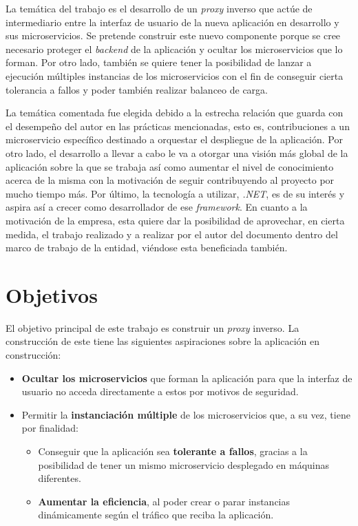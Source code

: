 \documentclass[11pt,spanish,listoffigures]{tfgetsinf}
\begin{document}
La temática del trabajo es el desarrollo de un \emph{proxy} inverso que actúe de intermediario entre la interfaz de usuario de la nueva aplicación en desarrollo y sus microservicios. Se pretende construir este nuevo componente porque se cree necesario proteger el \emph{backend} de la aplicación y ocultar los microservicios que lo forman. Por otro lado, también se quiere tener la posibilidad de lanzar a ejecución múltiples instancias de los microservicios con el fin de conseguir cierta tolerancia a fallos y poder también realizar balanceo de carga.

La temática comentada fue elegida debido a la estrecha relación que guarda con el desempeño del autor en las prácticas mencionadas, esto es, contribuciones a un microservicio específico destinado a orquestar el despliegue de la aplicación. Por otro lado, el desarrollo a llevar a cabo le va a otorgar una visión más global de la aplicación sobre la que se trabaja así como aumentar el nivel de conocimiento acerca de la misma con la motivación de seguir contribuyendo al proyecto por mucho tiempo más. Por último, la tecnología a utilizar, \emph{.NET}, es de su interés y aspira así a crecer como desarrollador de ese \emph{framework}. En cuanto a la motivación de la empresa, esta quiere dar la posibilidad de aprovechar, en cierta medida, el trabajo realizado y a realizar por el autor del documento dentro del marco de trabajo de la entidad, viéndose esta beneficiada también.

\section{Objetivos}

El objetivo principal de este trabajo es construir un \emph{proxy} inverso. La construcción de este tiene las siguientes aspiraciones sobre la aplicación en construcción:

\begin{itemize}

	\item \textbf{Ocultar los microservicios} que forman la aplicación para que la interfaz de usuario no acceda directamente a estos por motivos de seguridad.
	
	\item Permitir la \textbf{instanciación múltiple} de los microservicios que, a su vez, tiene por finalidad:
		\begin{itemize}
		
			\item Conseguir que la aplicación sea \textbf{tolerante a fallos}, gracias a la posibilidad de tener un mismo microservicio desplegado en máquinas diferentes.
			
			\item \textbf{Aumentar la eficiencia}, al poder crear o parar instancias dinámicamente según el tráfico que reciba la aplicación.
			
		\end{itemize}

\end{itemize}
\end{document}
